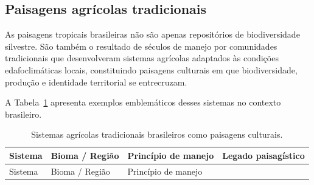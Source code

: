 \documentclass[
  portuguese,
  11pt,
  a4paper,
  open=any]{scrbook}
\begin{document}
\subsection{Paisagens agrícolas
tradicionais}\label{paisagens-agruxedcolas-tradicionais}

As paisagens tropicais brasileiras não são apenas repositórios de
biodiversidade silvestre. São também o resultado de séculos de manejo
por comunidades tradicionais que desenvolveram sistemas agrícolas
adaptados às condições edafoclimáticas locais, constituindo paisagens
culturais em que biodiversidade, produção e identidade territorial se
entrecruzam.

A Tabela~\ref{tbl-paisagens-tradicionais} apresenta exemplos
emblemáticos desses sistemas no contexto brasileiro.

\begin{longtable}[]{@{}
  >{\raggedright\arraybackslash}p{}
  >{\raggedright\arraybackslash}p{}
  >{\raggedright\arraybackslash}p{}
  >{\raggedright\arraybackslash}p{}@{}}
\caption{Sistemas agrícolas tradicionais brasileiros como paisagens
culturais.}\label{tbl-paisagens-tradicionais}\tabularnewline
\toprule\noalign{}
\begin{minipage}[b]{\linewidth}\raggedright
Sistema
\end{minipage} & \begin{minipage}[b]{\linewidth}\raggedright
Bioma / Região
\end{minipage} & \begin{minipage}[b]{\linewidth}\raggedright
Princípio de manejo
\end{minipage} & \begin{minipage}[b]{\linewidth}\raggedright
Legado paisagístico
\end{minipage} \\
\midrule\noalign{}
\endfirsthead
\toprule\noalign{}
\begin{minipage}[b]{\linewidth}\raggedright
Sistema
\end{minipage} & \begin{minipage}[b]{\linewidth}\raggedright
Bioma / Região
\end{minipage} & \begin{minipage}[b]{\linewidth}\raggedright
Princípio de manejo
\end{minipage} & \begin{minipage}[b]{\linewidth}\raggedright

\end{minipage}
\end{longtable}
\end{document}

